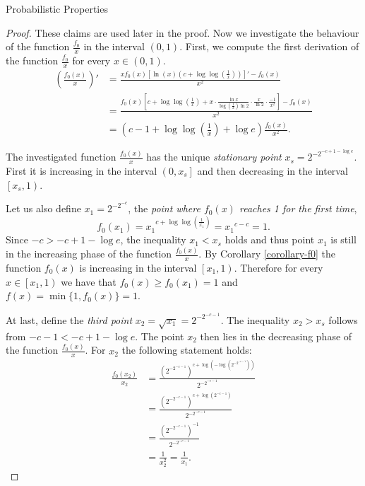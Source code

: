 \begin{section}{Probabilistic Properties}
\begin{proof}
These claims are used later in the proof. Now we investigate the behaviour of the function $\frac{f_0}{x}$ in the interval $(0, 1)$. First, we compute the first derivation of the function $\frac{f_0}{x}$ for every $x \in (0, 1)$.
\[
\begin{split}
\left(\frac{f_0(x)}{x}\right)' 
	& = \frac{xf_0(x)\left[\ln(x)\left(c + \log \log \left(\frac{1}{x}\right)\right)\right]' - f_0(x)}{x^2} \\
	& = \frac{f_0(x)\left[c + \log \log \left(\frac{1}{x}\right) + x \cdot \frac{\ln x}{\log\left(\frac{1}{x}\right) \ln 2}\cdot\frac{x}{\ln 2}\cdot\frac{-1}{x ^ 2} \right] - f_0(x)}{x^2} \\
	& = \left(c - 1 + \log \log \left( \frac{1}{x} \right) + \log e \right)\frac{f_0(x)}{x^2} \text{.}
\end{split}
\]

The investigated function $\frac{f_0(x)}{x}$ has the unique \emph{stationary point} $x_s = 2 ^ {-2 ^ {-c + 1 - \log e}}$. First it is increasing in the interval $\left(0, x_s \right]$ and then decreasing in the interval $\left[x_s, 1\right)$. 

Let us also define $x_1 = 2 ^ {-2 ^ {-c}}$, the \emph{point where $f_0(x)$ reaches 1 for the first time},
\[
f_0(x_1) = {x_1} ^ {c + \log \log \left(\frac{1}{x_1}\right)} = {x_1} ^ {c - c} = 1 \text{.}
\]
Since $-c > -c + 1 -\log e$, the inequality $x_1 < x_s$ holds and thus point $x_1$ is still in the increasing phase of the function $\frac{f_0(x)}{x}$.
By Corollary \ref{corollary-f0} the function $f_0(x)$ is increasing in the interval $\left[x_1, 1\right)$. Therefore for every $x \in \left[x_1, 1\right)$ we have that $f_0(x) \geq f_0(x_1) = 1$ and $f(x) = \min \{1, f_0(x)\} = 1$.

At last, define the \emph{third point} $x_2 = \sqrt{x_1} = 2 ^ {-2 ^ {-c - 1}}$. The inequality $x_2 > x_s$ follows from $-c - 1 < -c + 1 - \log e$. The point $x_2$ then lies in the decreasing phase of the function $\frac{f_0(x)}{x}$. For $x_2$ the following statement holds:
\[
\begin{split}
\frac{f_0(x_2)}{x_2} 
	& = \frac{\left(2 ^ {-2 ^ {-c - 1}}\right) ^ {c + \log \left(- \log \left(2 ^ {-2 ^ {-c - 1}}\right)\right)}}{2 ^ {-2 ^ {-c - 1}}} \\
	& = \frac{\left(2 ^ {-2 ^ {-c - 1}}\right) ^ {c + \log \left(2 ^ {-c - 1}\right)}}{2 ^ {-2 ^ {-c - 1}}} \\
	& = \frac{\left(2 ^ {-2 ^ {-c - 1}}\right) ^ {-1}}{2 ^ {-2 ^ {-c - 1}}} \\
	& = \frac{1}{x_2^2} = \frac{1}{x_1} \text{.}
\end{split}
\]


\end{proof}
\end{section}
